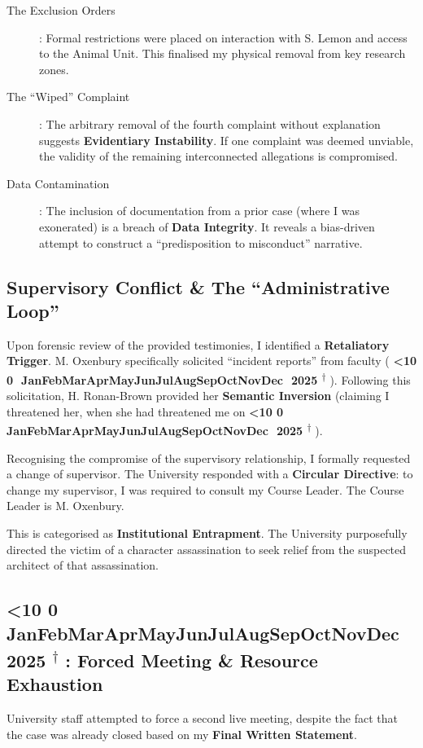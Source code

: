 \documentclass{EMBASSY}
\DeclareRobustCommand{\gmt}[3]{%
    \texorpdfstring{%
        {\color{DateGold}\textbf{%
            \ifnum#1<10 0\fi#1\,\textperiodcentered\,%
            \ifcase#2\or Jan\or Feb\or Mar\or Apr\or May\or Jun\or Jul\or Aug\or Sep\or Oct\or Nov\or Dec\fi
            \,\textperiodcentered\,20#3%
            \textsuperscript{$\dagger$}%
        }}%
    }{%
        (#1/#2/#3)%
    }%
}
\begin{document}
\begin{description}
	\item[The Exclusion Orders]: Formal restrictions were placed on interaction with S. Lemon and access to the Animal Unit. This finalised my physical removal from key research zones.
	\item[The ``Wiped'' Complaint]: The arbitrary removal of the fourth complaint without explanation suggests \textbf{Evidentiary Instability}. If one complaint was deemed unviable, the validity of the remaining interconnected allegations is compromised.
	\item[Data Contamination]: The inclusion of documentation from a prior case (where I was exonerated) is a breach of \textbf{Data Integrity}. It reveals a bias-driven attempt to construct a ``predisposition to misconduct'' narrative.
\end{description}

\subsection{Supervisory Conflict \& The ``Administrative Loop''}
Upon forensic review of the provided testimonies, I identified a \textbf{Retaliatory Trigger}. M. Oxenbury specifically solicited ``incident reports'' from faculty (\gmt{11}{11}{25}). Following this solicitation, H. Ronan-Brown provided her \textbf{Semantic Inversion} (claiming I threatened her, when she had threatened me on \gmt{4}{11}{25}).

Recognising the compromise of the supervisory relationship, I formally requested a change of supervisor. The University responded with a \textbf{Circular Directive}: to change my supervisor, I was required to consult my Course Leader. The Course Leader is M. Oxenbury.

This is categorised as \textbf{Institutional Entrapment}. The University purposefully directed the victim of a character assassination to seek relief from the suspected architect of that assassination.

\subsection{\gmt{15}{12}{25}: Forced Meeting \& Resource Exhaustion}
University staff attempted to force a second live meeting, despite the fact that the case was already closed based on my \textbf{Final Written Statement}.
\end{document}
